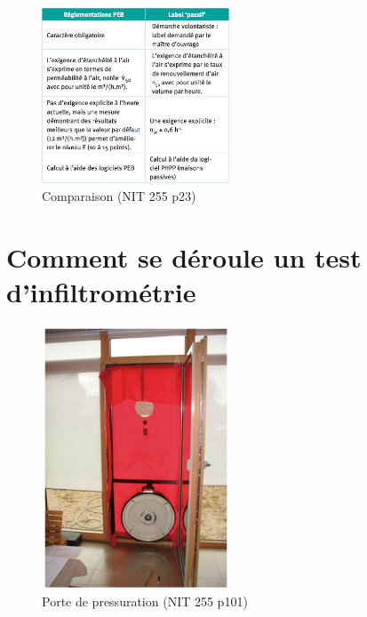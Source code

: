 \begin{figure}[ht]
\centering
\includegraphics[width=0.5\textwidth]{TableauComparatif}
\caption{\label{TableauComparatif} Comparaison (NIT 255 p23)}
\end{figure}


\section{Comment se déroule un test d'infiltrométrie}

\begin{figure}[ht]
\centering
\includegraphics[width=0.5\textwidth]{Blowerdoor}
\caption{\label{Blowerdoor} Porte de pressuration (NIT 255 p101)}
\end{figure}


